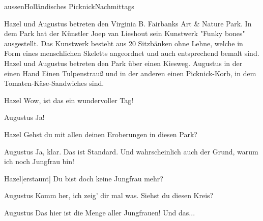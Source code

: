 \documentclass[12pt]{article}
\begin{document}
    \begin{scene}{aussen}{Holländisches Picknick}{Nachmittags}
        \begin{scenedescription}
            \gls{Hazel} und \gls{Augustus} betreten den Virginia B. Fairbanks Art \& Nature Park.
            In dem Park hat der Künstler Joep van Lieshout sein Kunstwerk "Funky bones" ausgestellt.
            Das Kunstwerk besteht aus 20 Sitzbänken ohne Lehne, welche in Form eines menschlichen Skeletts angeordnet und auch entsprechend bemalt sind.
            \gls{Hazel} und \gls{Augustus} betreten den Park über einen Kiesweg.
            \gls{Augustus} in der einen Hand Einen Tulpenstrauß und in der anderen einen Picknick-Korb, in dem Tomaten-Käse-Sandwiches sind.
        \end{scenedescription}

        \begin{dialog}{Hazel}
            Wow, ist das ein wundervoller Tag!
        \end{dialog}

        \begin{dialog}{Augustus}
            Ja!
        \end{dialog}

        \begin{dialog}{Hazel}
            Gehst du mit allen deinen Eroberungen in diesen Park?
        \end{dialog}

        \begin{dialog}{Augustus}
            Ja, klar.
            Das ist Standard.
            Und wahrscheinlich auch der Grund, warum ich noch Jungfrau bin!
        \end{dialog}

        \begin{dialog}{Hazel}[erstaunt]
            Du bist doch keine Jungfrau mehr?
        \end{dialog}

        \begin{dialog}{Augustus}
            Komm her, ich zeig' dir mal was.
            Siehst du diesen Kreis?
        \end{dialog}


        \begin{dialog}{Augustus}
            Das hier ist die Menge aller Jungfrauen!
            Und das...
        \end{dialog}


\end{scene}
\end{document}
